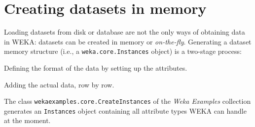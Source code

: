 \section{Creating datasets in memory}
\label{api_creating_datasets}
Loading datasets from disk or database are not the only ways of obtaining data
in WEKA: datasets can be created in memory or \textit{on-the-fly}. Generating
a dataset memory structure (i.e., a \texttt{weka.core.Instances} object) is a
two-stage process:
\begin{tight_enumerate}
	\item Defining the format of the data by setting up the attributes.
	\item Adding the actual data, row by row.
\end{tight_enumerate}
The class \texttt{wekaexamples.core.CreateInstances} of the \textit{Weka
Examples} collection\cite{wekaexamples} generates an \texttt{Instances} object
containing all attribute types WEKA can handle at the moment.

